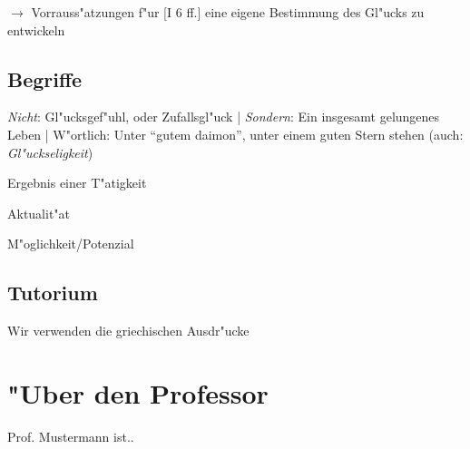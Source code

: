 \documentclass[emulatestandardclasses]{scrartcl}
\begin{document}
\noindent $\rightarrow$ Vorrauss"atzungen f"ur [I 6 ff.] eine eigene Bestimmung des Gl"ucks zu entwickeln

\subsection{Begriffe}

\begin{description}[leftmargin=!,labelwidth=\widthof{\bfseries \emph{eudaemonia}}]
  \item[\emph{eudaimonia}] \emph{Nicht}: Gl"ucksgef"uhl, oder Zufallsgl"uck | \emph{Sondern}: Ein insgesamt gelungenes Leben | W"ortlich: Unter "`gutem daimon"', unter einem guten Stern stehen (auch: \emph{Gl"uckseligkeit})
    \item[\emph{ergon}] Ergebnis einer T"atigkeit
  \item[\emph{energeia}] Aktualit"at
  \item[\emph{dynamis}] M"oglichkeit/Potenzial
\end{description}

\subsection{Tutorium}

Wir verwenden die  griechischen Ausdr"ucke

\newpage
\section{"Uber den Professor}
Prof. Mustermann ist..


\end{document}
